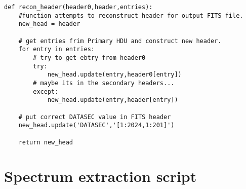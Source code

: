\begin{footnotesize}
\begin{verbatim}
def recon_header(header0,header,entries):
    #function attempts to reconstruct header for output FITS file.
    new_head = header

    # get entries frim Primary HDU and construct new header.
    for entry in entries:
        # try to get ebtry from header0
        try:
            new_head.update(entry,header0[entry])
        # maybe its in the secondary headers...
        except:
            new_head.update(entry,header[entry])

    # put correct DATASEC value in FITS header
    new_head.update('DATASEC','[1:2024,1:201]')

    return new_head

\end{verbatim}
 

\end{footnotesize}



\chapter{Spectrum extraction script}

\label{spec_extr}

